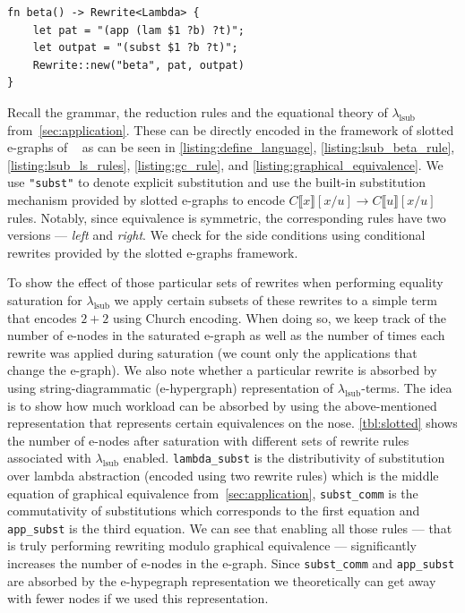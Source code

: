 \begin{listing}
	\begin{verbatim}
fn beta() -> Rewrite<Lambda> {
    let pat = "(app (lam $1 ?b) ?t)";
    let outpat = "(subst $1 ?b ?t)";
    Rewrite::new("beta", pat, outpat)
}
	\end{verbatim}
	\caption{$\lambda_{\text{lsub}}$ $d\beta$-rule}
	\label{listing:lsub_beta_rule}
\end{listing}


Recall the grammar, the reduction rules and the equational theory of $\lambda_{\text{lsub}}$ from~\autoref{sec:application}.
These can be directly encoded in the framework of slotted e-graphs of ~\citet{slotted-egraphs} as can be seen in \autoref{listing:define_language}, \autoref{listing:lsub_beta_rule}, \autoref{listing:lsub_ls_rules}, \autoref{listing:gc_rule}, and \autoref{listing:graphical_equivalence}.
We use \texttt{"subst"} to denote explicit substitution and use the built-in substitution mechanism provided by slotted e-graphs to encode $C\llbracket x \rrbracket[x / u] \to C\llbracket u \rrbracket[x/u]$ rules.
Notably, since equivalence is symmetric, the corresponding rules have two versions --- \textit{left} and \textit{right}.
We check for the side conditions using conditional rewrites provided by the slotted e-graphs framework.

To show the effect of those particular sets of rewrites when performing equality saturation for $\lambda_{\text{lsub}}$ we apply certain subsets of these rewrites to a simple term that encodes $2 + 2$ using Church encoding.
When doing so, we keep track of the number of e-nodes in the saturated e-graph as well as the number of times each rewrite was applied during saturation (we count only the applications that change the e-graph).
We also note whether a particular rewrite is absorbed by using string-diagrammatic (e-hypergraph) representation of $\lambda_{\text{lsub}}$-terms.
The idea is to show how much workload can be absorbed by using the above-mentioned representation that represents certain equivalences on the nose.
\autoref{tbl:slotted} shows the number of e-nodes after saturation with different sets of rewrite rules associated with $\lambda_{\text{lsub}}$ enabled.
\texttt{lambda\_subst} is the distributivity of substitution over lambda abstraction (encoded using two rewrite rules) which is the middle equation of graphical equivalence from~\autoref{sec:application}, \texttt{subst\_comm} is the commutativity of substitutions which corresponds to the first equation and \texttt{app\_subst} is the third equation.
We can see that enabling all those rules --- that is truly performing rewriting modulo graphical equivalence --- significantly increases the number of e-nodes in the e-graph.
Since \texttt{subst\_comm} and \texttt{app\_subst} are absorbed by the e-hypegraph representation we theoretically can get away with fewer nodes if we used this representation.


